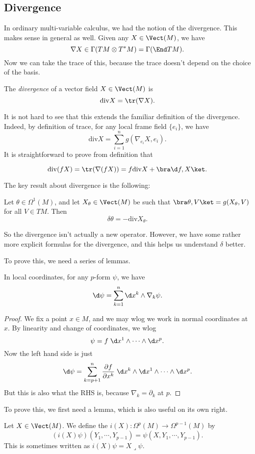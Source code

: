 \documentclass[a4paper]{article}
\renewcommand\div{\mathrm{div}}
\begin{document}
\subsection{Divergence}
In ordinary multi-variable calculus, we had the notion of the divergence. This makes sense in general as well. Given any $X \in \Vect(M)$, we have
\[
  \nabla X \in \Gamma(TM \otimes T^*M) = \Gamma(\End TM).
\]
Now we can take the trace of this, because the trace doesn't depend on the choice of the basis.
\begin{defi}[Divergence]
  The \emph{divergence} of a vector field $X \in \Vect(M)$ is
  \[
    \div X = \tr (\nabla X).
  \]
\end{defi}
It is not hard to see that this extends the familiar definition of the divergence. Indeed, by definition of trace, for any local frame field $\{e_i\}$, we have
\[
  \div X = \sum_{i = 1}^n g(\nabla_{e_i} X, e_i).
\]
It is straightforward to prove from definition that
\begin{prop}
  \[
    \div (fX) = \tr(\nabla (fX)) = f \div X + \bra \d f, X\ket.
  \]
\end{prop}
The key result about divergence is the following:
\begin{thm}
  Let $\theta \in \Omega^1(M)$, and let $X_\theta \in \Vect(M)$ be such that $\bra \theta, V\ket = g(X_\theta, V)$ for all $V \in TM$. Then
  \[
    \delta \theta = - \div X_\theta.
  \]
\end{thm}
So the divergence isn't actually a new operator. However, we have some rather more explicit formulas for the divergence, and this helps us understand $\delta$ better.

To prove this, we need a series of lemmas.
\begin{lemma}
  In local coordinates, for any $p$-form $\psi$, we have
  \[
    \d \psi = \sum_{k = 1}^n \d x^k \wedge \nabla_k \psi.
  \]
\end{lemma}

\begin{proof}
  We fix a point $x \in M$, and we may wlog we work in normal coordinates at $x$. By linearity and change of coordinates, we wlog
  \[
    \psi = f\; \d x^1 \wedge \cdots \wedge \d x^p.
  \]
  Now the left hand side is just
  \[
    \d \psi = \sum_{k = p + 1}^n  \frac{\partial f}{\partial x^k}\; \d x^k \wedge \d x^1 \wedge \cdots \wedge \d x^p.
  \]
  But this is also what the RHS is, because $\nabla_k = \partial_k$ at $p$.
\end{proof}
To prove this, we first need a lemma, which is also useful on its own right.
\begin{defi}
  Let $X \in \Vect(M)$. We define the  $i(X): \Omega^p(M) \to \Omega^{p - 1}(M)$ by
  \[
    (i(X)\psi)(Y_1, \cdots, Y_{p - 1}) = \psi(X, Y_1, \cdots, Y_{p - 1}).
  \]
  This is sometimes written as $i(X) \psi = X \lrcorner \psi$.
\end{defi}
\end{document}
